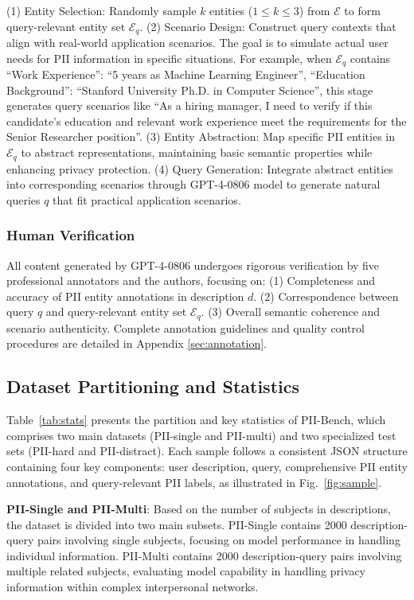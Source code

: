 (1) Entity Selection: Randomly sample $k$ entities ($1 \leq k \leq 3$) from $\mathcal{E}$ to form query-relevant entity set $\mathcal{E}_q$.
(2) Scenario Design: Construct query contexts that align with real-world application scenarios. The goal is to simulate actual user needs for PII information in specific situations. For example, when $\mathcal{E}_q$ contains {``Work Experience'': ``5 years as Machine Learning Engineer'', ``Education Background'': ``Stanford University Ph.D. in Computer Science''}, this stage generates query scenarios like ``As a hiring manager, I need to verify if this candidate's education and relevant work experience meet the requirements for the Senior Researcher position''.
(3) Entity Abstraction: Map specific PII entities in $\mathcal{E}_q$ to abstract representations, maintaining basic semantic properties while enhancing privacy protection.
(4) Query Generation: Integrate abstract entities into corresponding scenarios through GPT-4-0806 model to generate natural queries $q$ that fit practical application scenarios.

\subsubsection{Human Verification}
All content generated by GPT-4-0806 undergoes rigorous verification by five professional annotators and the authors, focusing on:
(1) Completeness and accuracy of PII entity annotations in description $d$.
(2) Correspondence between query $q$ and query-relevant entity set $\mathcal{E}_q$.
(3) Overall semantic coherence and scenario authenticity.
Complete annotation guidelines and quality control procedures are detailed in Appendix \ref{sec:annotation}.

\subsection{Dataset Partitioning and Statistics}


Table~\ref{tab:stats} presents the partition and key statistics of PII-Bench, which comprises two main datasets (PII-single and PII-multi) and two specialized test sets (PII-hard and PII-distract).
Each sample follows a consistent JSON structure containing four key components:
user description, query, comprehensive PII entity annotations, and query-relevant PII labels, as illustrated in Fig.~\ref{fig:sample}.


\textbf{PII-Single and PII-Multi}:
Based on the number of subjects in descriptions, the dataset is divided into two main subsets.
PII-Single contains 2000 description-query pairs involving single subjects, focusing on model performance in handling individual information.
PII-Multi contains 2000 description-query pairs involving multiple related subjects, evaluating model capability in handling privacy information within complex interpersonal networks.

